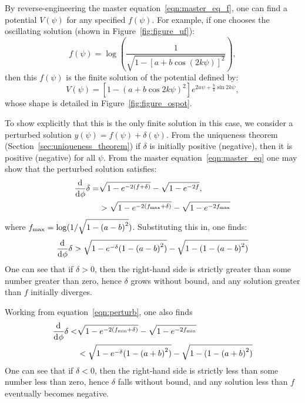 By reverse-engineering the master equation~\eqref{eqn:master_eq_f}, one can find a potential $V(\psi)$ for any specified $f(\psi)$. For example, if one chooses the oscillating solution (shown in Figure~\ref{fig:figure_uf}):
%
\begin{equation}
  f(\psi) = \log\left( \frac{1}{\sqrt{1-{[a+b\cos(2k\psi)]}^2}}\right),
  \label{eqn:uf_example}
\end{equation}
%
then this $f(\psi)$ is the finite solution of the potential defined by:
%
\begin{equation}
	V(\psi)
    =
    \left[ 1-{(a+b \cos2k\psi)}^2 \right]
    e^{2 a \psi +\frac{b}{k} \sin 2k\psi},
    \label{eqn:Vphi_uf_example}
\end{equation}
whose shape is detailed in Figure~\ref{fig:figure_ospot}.
%

To show explicitly that this is the only finite solution in this case, we consider a perturbed solution $y(\psi) = f(\psi)+\delta(\psi)$.  From the uniqueness theorem (Section~\ref{sec:uniqueness_theorem}) if $\delta$ is initially positive (negative), then it is positive (negative) for all $\psi$. From the master equation~\eqref{eqn:master_eq} one may show that the perturbed solution satisfies:
%
\begin{align}
  \frac{\operatorname{d}^{}\!{}}{\operatorname{d}^{}\!{\phi}}\delta 
  =& 
  \sqrt{1-e^{-2(f+\delta)}} -\sqrt{1-e^{-2f}}, 
  \label{eqn:perturb}
  \\
  &>
  \sqrt{1-e^{-2(f_\mathrm{max}+\delta)}} -\sqrt{1-e^{-2f_\mathrm{max}}}
\end{align}
%
where $f_\mathrm{max} = \log(1/\sqrt{1-{(a-b)}^2})$. Substituting this in, one finds:
%
\begin{align}
  \frac{\operatorname{d}^{}\!{}}{\operatorname{d}^{}\!{\phi}}\delta 
  > 
  \sqrt{1-e^{-\delta}({1-{(a-b)}^2})} - \sqrt{1-({1-{(a-b)}^2})}
\end{align}
%
One can see that if $\delta>0$, then the right-hand side is strictly greater than some number greater than zero, hence $\delta$ grows without bound, and any solution greater than $f$ initially diverges. 

Working from equation~\eqref{eqn:perturb}, one also finds
%
\begin{align}
  \frac{\operatorname{d}^{}\!{}}{\operatorname{d}^{}\!{\phi}}\delta 
  <&
  \sqrt{1-e^{-2(f_\mathrm{min}+\delta)}} -\sqrt{1-e^{-2f_\mathrm{min}}} 
  \nonumber
  \\
  &<
  \sqrt{1-e^{-\delta}({1-{(a+b)}^2})} - \sqrt{1-({1-{(a+b)}^2})}
\end{align}
%
One can see that if $\delta<0$, then the right-hand side is strictly less than some number less than zero, hence $\delta$ falls without bound, and any solution less than $f$ eventually becomes negative. 

